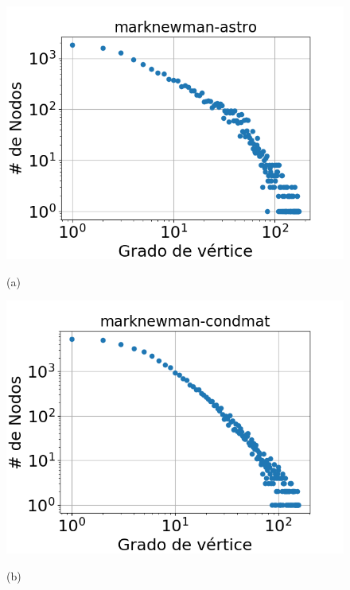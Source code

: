\begin{figure}[p]
    	\centering
    	\begin{minipage}{1\textwidth}
    		\centering
    		\begin{minipage}{0.45\textwidth}
    			\centering
    			\includegraphics[width=1\linewidth]{img/grades/marknewman-astro.png}
    			
    			(a)
    		\end{minipage}
    		\begin{minipage}{0.45\textwidth}
    			\centering
    			\includegraphics[width=1\linewidth]{img/grades/marknewman-condmat.png}
    			
    			(b)
    		\end{minipage}  		
    	\end{minipage}
    	

\end{figure}
